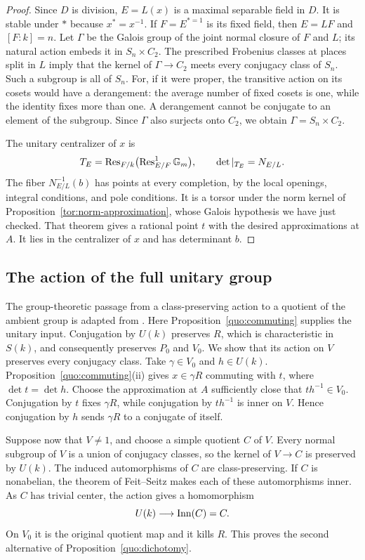 \begin{proof}
Since $D$ is division, $E=L(x)$ is a maximal separable field in $D$.
It is stable under $*$ because $x^*=x^{-1}$.  If $F=E^{*=1}$ is its
fixed field, then $E=LF$ and $[F:k]=n$.  Let $\Gamma$ be the Galois
group of the joint normal closure of $F$ and $L$; its natural action
embeds it in $S_n\times C_2$.  The prescribed Frobenius classes at
places split in $L$ imply that the kernel of $\Gamma\to C_2$ meets
every conjugacy class of $S_n$.  Such a subgroup is all of $S_n$.
For, if it were proper, the transitive action on its cosets would
have a derangement: the average number of fixed cosets is one, while
the identity fixes more than one.  A derangement cannot be conjugate
to an element of the subgroup.  Since $\Gamma$ also surjects onto
$C_2$, we obtain $\Gamma=S_n\times C_2$.

The unitary centralizer of $x$ is
\[
 T_E=\operatorname{Res}_{F/k}\bigl(\operatorname{Res}^1_{E/F}\mathbb G_m\bigr),
 \qquad \det|_{T_E}=N_{E/L}.
\]
The fiber $N_{E/L}^{-1}(b)$ has points at every completion, by the
local openings, integral conditions, and pole conditions.  It is a
torsor under the norm kernel of Proposition~\ref{tor:norm-approximation},
whose Galois hypothesis we have just checked.  That theorem gives a
rational point $t$ with the desired approximations at $A$.
It lies in the centralizer of $x$ and has determinant $b$.
\end{proof}

\subsection{The action of the full unitary group}

The group-theoretic passage from a class-preserving action to a quotient
of the ambient group is adapted from
\cite[Corollary~2.3, Theorem~2.4, and the proof of Theorem~2.1]{RapinchukPotapchik1996}.
Here Proposition~\ref{quo:commuting} supplies the unitary input.
Conjugation by $U(k)$ preserves $R$, which is characteristic in
$S(k)$, and consequently preserves $P_0$ and $V_0$.  We show that its
action on $V$ preserves every conjugacy class.  Take $\gamma\in V_0$
and $h\in U(k)$.  Proposition~\ref{quo:commuting}(ii) gives
$x\in\gamma R$ commuting with $t$, where $\det t=\det h$.
Choose the approximation at $A$ sufficiently close that
$th^{-1}\in V_0$.  Conjugation by $t$ fixes $\gamma R$, while
conjugation by $th^{-1}$ is inner on $V$.  Hence conjugation by $h$
sends $\gamma R$ to a conjugate of itself.

Suppose now that $V\ne1$, and choose a simple quotient $C$ of $V$.
Every normal subgroup of $V$ is a union of conjugacy classes, so the
kernel of $V\to C$ is preserved by $U(k)$.  The induced automorphisms
of $C$ are class-preserving.  If $C$ is nonabelian, the theorem of
Feit--Seitz \cite[Theorem~C]{FeitSeitz} makes each of these automorphisms
inner.  As $C$ has trivial center, the action gives a homomorphism
\[
 U(k)\longrightarrow\operatorname{Inn}(C)=C.
\]
On $V_0$ it is the original quotient map and it kills $R$.
This proves the second alternative of Proposition~\ref{quo:dichotomy}.

